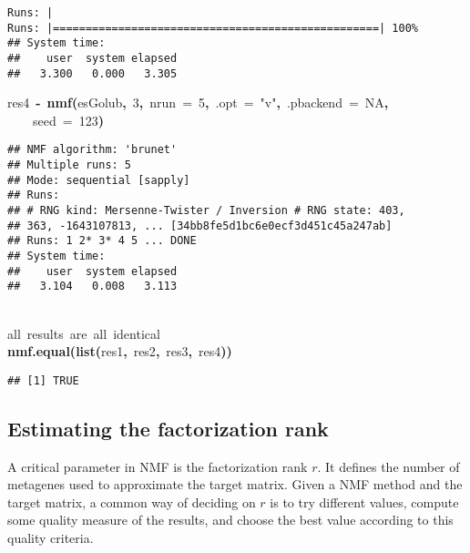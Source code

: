 \documentclass[a4paper]{article}\usepackage{graphicx, color}
\makeatletter
\newcommand{\hlnumber}[1]{\textcolor[rgb]{0,0,0}{#1}}%
\newcommand{\hlfunctioncall}[1]{\textcolor[rgb]{0.501960784313725,0,0.329411764705882}{\textbf{#1}}}%
\newcommand{\hlstring}[1]{\textcolor[rgb]{0.6,0.6,1}{#1}}%
\newcommand{\hlkeyword}[1]{\textcolor[rgb]{0,0,0}{\textbf{#1}}}%
\newcommand{\hlargument}[1]{\textcolor[rgb]{0.690196078431373,0.250980392156863,0.0196078431372549}{#1}}%
\newcommand{\hlcomment}[1]{\textcolor[rgb]{0.180392156862745,0.6,0.341176470588235}{#1}}%
\newcommand{\hlassignement}[1]{\textcolor[rgb]{0,0,0}{\textbf{#1}}}%
\newcommand{\hlsymbol}[1]{\textcolor[rgb]{0,0,0}{#1}}%
\newcommand{\hlstd}[1]{\textcolor[rgb]{0,0,0}{#1}}%
\newenvironment{kframe}{%
 \def\FrameCommand##1{\hskip\@totalleftmargin \hskip-\fboxsep
 \colorbox{shadecolor}{##1}\hskip-\fboxsep
     \hskip-\linewidth \hskip-\@totalleftmargin \hskip\columnwidth}%
 \MakeFramed {\advance\hsize-\width
   \@totalleftmargin\z@ \linewidth\hsize
   \@setminipage}}%
 {\par\unskip\endMakeFramed}
\newenvironment{knitrout}{}{} %
\makeatother
\begin{document}
\begin{knitrout}
\begin{kframe}
\begin{verbatim}
Runs: |                                                        
Runs: |==================================================| 100%
## System time:
##    user  system elapsed 
##   3.300   0.000   3.305 
\end{verbatim}
\begin{flushleft}
\ttfamily\noindent
\hlsymbol{res4}{\ }\hlassignement{\usebox{\hlnormalsizeboxlessthan}-}{\ }\hlfunctioncall{nmf}\hlkeyword{(}\hlsymbol{esGolub}\hlkeyword{,}{\ }\hlnumber{3}\hlkeyword{,}{\ }\hlargument{nrun}{\ }\hlargument{=}{\ }\hlnumber{5}\hlkeyword{,}{\ }\hlargument{.opt}{\ }\hlargument{=}{\ }\hlstring{"{}v"{}}\hlkeyword{,}{\ }\hlargument{.pbackend}{\ }\hlargument{=}{\ }\hlnumber{NA}\hlkeyword{,}\hspace*{\fill}\\
\hlstd{}{\ }{\ }{\ }{\ }\hlargument{seed}{\ }\hlargument{=}{\ }\hlnumber{123}\hlkeyword{)}\mbox{}
\normalfont
\end{flushleft}
\begin{verbatim}
## NMF algorithm: 'brunet'
## Multiple runs: 5
## Mode: sequential [sapply]
## Runs:
## # RNG kind: Mersenne-Twister / Inversion # RNG state: 403,
## 363, -1643107813, ... [34bb8fe5d1bc6e0ecf3d451c45a247ab]
## Runs: 1 2* 3* 4 5 ... DONE
## System time:
##    user  system elapsed 
##   3.104   0.008   3.113 
\end{verbatim}
\begin{flushleft}
\ttfamily\noindent
\hspace*{\fill}\\
\hlstd{}\hlcomment{\usebox{\hlnormalsizeboxhash}{\ }all{\ }results{\ }are{\ }all{\ }identical}\hspace*{\fill}\\
\hlstd{}\hlfunctioncall{nmf.equal}\hlkeyword{(}\hlfunctioncall{list}\hlkeyword{(}\hlsymbol{res1}\hlkeyword{,}{\ }\hlsymbol{res2}\hlkeyword{,}{\ }\hlsymbol{res3}\hlkeyword{,}{\ }\hlsymbol{res4}\hlkeyword{)}\hlkeyword{)}\mbox{}
\normalfont
\end{flushleft}
\begin{verbatim}
## [1] TRUE
\end{verbatim}
\end{kframe}
\end{knitrout}



\subsection{Estimating the factorization rank}
A critical parameter in NMF is the factorization rank $r$. 
It defines the number of metagenes used to approximate the target matrix.
Given a NMF method and the target matrix, a common way of deciding on $r$ is to try different values, compute some quality measure of the results, and choose the best value according to this quality criteria.
\end{document}

